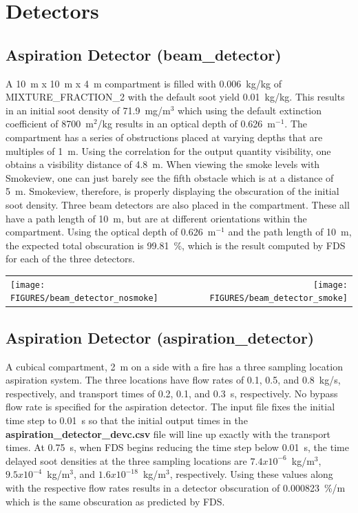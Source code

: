 \documentclass[11pt]{book}
\begin{document}
\clearpage

\section{Detectors}

\subsection{Aspiration Detector ({\bf beam\_detector}) }

A 10~m x 10~m x 4~m compartment is filled with 0.006~kg/kg of {\ct MIXTURE\_FRACTION\_2} with the default soot yield
0.01~kg/kg.  This results in an initial soot density of 71.9~mg/m$^3$ which using the default extinction coefficient of
8700~m$^2$/kg results in an optical depth of 0.626~m$^{-1}$.  The compartment has a series of obstructions placed at varying depths that are
multiples of 1~m.  Using the correlation for the output quantity {\ct visibility}, one obtains a visibility distance of 4.8~m.
When viewing the smoke levels with Smokeview, one can just barely see the fifth obstacle which is at a distance of 5~m.
Smokeview, therefore, is properly displaying the obscuration of the initial soot density.  Three beam detectors are also
placed in the compartment.  These all have a path length of 10~m, but are at different orientations within the compartment.
Using the optical depth of 0.626~m$^{-1}$ and the path length of 10~m, the expected total obscuration is 99.81~\%, which is the
result computed by FDS for each of the three detectors.
\begin{tabular*}{\textwidth}{lr}
\texttt{[image: FIGURES/beam\_detector\_nosmoke]} &
\texttt{[image: FIGURES/beam\_detector\_smoke]}
\end{tabular*}

\clearpage

\subsection{Aspiration Detector ({\bf aspiration\_detector}) }

A cubical compartment, 2~m on a side with a fire has a three sampling location aspiration system.  The three locations
have flow rates of 0.1, 0.5, and 0.8~kg/s, respectively, and transport times of 0.2, 0.1, and 0.3~s, respectively.  No bypass flow rate is
specified for the aspiration detector.  The input file fixes the initial time step to 0.01~s so that the initial output
times in the {\bf aspiration\_detector\_devc.csv} file will line up exactly with the transport times.  At 0.75~s, when
FDS begins reducing the time step below 0.01~s, the time delayed soot densities at the three sampling locations are
$7.4x10^{-6}$~kg/m$^3$, $9.5x10^{-4}$~kg/m$^3$, and $1.6x10^{-18}$~kg/m$^3$, respectively.  Using these values along with the
respective flow rates results in a detector obscuration of 0.000823~\%/m which is the same obscuration as predicted by FDS.
\end{document}
